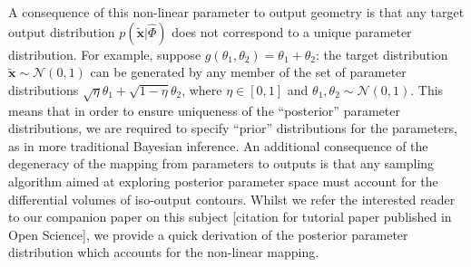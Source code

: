 \documentclass[10pt,letterpaper]{article}
\begin{document}
A consequence of this non-linear parameter to output geometry is that any target output distribution $p(\tilde{\boldsymbol{x}}|\hat{\Phi})$ does not correspond to a unique parameter distribution. For example, suppose $g(\theta_1, \theta_2) = \theta_1 + \theta_2$: the target distribution $\tilde{\boldsymbol{x}}\sim \mathcal{N}(0, 1)$ can be generated by any member of the set of parameter distributions $\sqrt{\eta} \theta_1 + \sqrt{1 - \eta} \theta_2$, where $\eta\in [0, 1]$ and $\theta_1, \theta_2 \sim \mathcal{N}(0, 1)$. This means that in order to ensure uniqueness of the ``posterior'' parameter distributions, we are required to specify ``prior'' distributions for the parameters, as in more traditional Bayesian inference. An additional consequence of the degeneracy of the mapping from parameters to outputs is that any sampling algorithm aimed at exploring posterior parameter space must account for the differential volumes of iso-output contours. Whilst we refer the interested reader to our companion paper on this subject [citation for tutorial paper published in Open Science], we provide a quick derivation of the posterior parameter distribution which accounts for the non-linear mapping.
\end{document}
